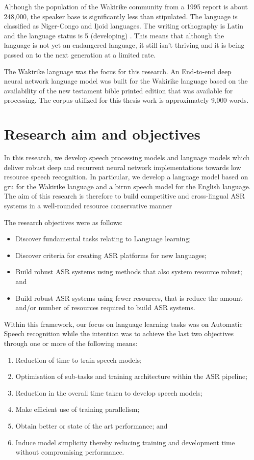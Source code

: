 Although the population of the Wakirike community from a 1995 report \citep{ethnologue} is about 248,000, the speaker base is  significantly less than stipulated.  The language is classified as Niger-Congo and Ijoid languages.  The writing orthography is Latin and the language status is 5 (developing) \citep{ethnologue}.  This means that although the language is not yet an endangered language, it still isn't thriving and it is being passed on to the next generation at a limited rate.

The Wakirike language was the focus for this research.  An End-to-end deep neural network language model was built for the Wakirike language based on the availability of the new testament bible printed edition that was available for processing.  The corpus utilized for this thesis work is approximately 9,000 words.

\section{Research aim and objectives}
In this research, we develop speech processing models and language models which deliver robust deep and recurrent neural network implementations towards low resource speech recognition.  In particular, we develop a language model based on \acrfull{gru} for the Wakirike language and a \acrfull{birnn} speech model for the English language.  The aim of this research is therefore to build competitive and cross-lingual ASR systems in a well-rounded resource conservative manner

The research objectives were as follows:
\begin{itemize}
    \item Discover fundamental tasks relating to Language learning;
    \item Discover criteria for creating ASR platforms for new languages;
    \item Build robust ASR systems using methods that also system resource robust; and
    \item Build robust ASR systems using fewer resources, that is reduce the amount and/or number of resources required to build ASR systems.
\end{itemize}

Within this framework, our focus on language learning tasks was on Automatic Speech recognition while the intention was to achieve the last two objectives through one or more of the following means:
\begin{enumerate}
    \item Reduction of time to train speech models;
    \item Optimisation of sub-tasks and training architecture within the ASR pipeline;
    \item Reduction in the overall time taken to develop speech models;
    \item Make efficient use of training parallelism;
    \item Obtain better or state of the art performance; and
    \item Induce model simplicity thereby reducing training and development time without compromising performance.
\end{enumerate}

